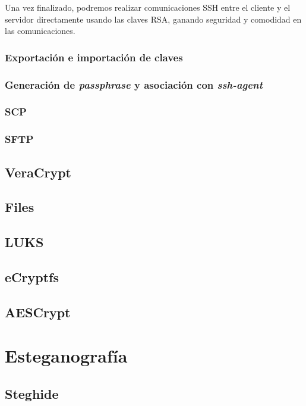 \documentclass[a4paper, 11pt, titlepage]{book}
\begin{document}
                Una vez finalizado, podremos realizar comunicaciones SSH entre el cliente y 
                el servidor directamente usando las claves RSA, ganando seguridad y comodidad 
                en las comunicaciones.
    
            \subsubsection{Exportación e importación de claves}
            \subsubsection{Generación de \textit{passphrase} y asociación con \textit{ssh-agent}}
            \subsubsection{SCP} \label{scp}
            \subsubsection{SFTP}
    
        \subsection{VeraCrypt}
        \subsection{Files}
        \subsection{LUKS}
        \subsection{eCryptfs}
        \subsection{AESCrypt}
    
    \section{Esteganografía}
    
        \subsection{Steghide}
    
\end{document}
